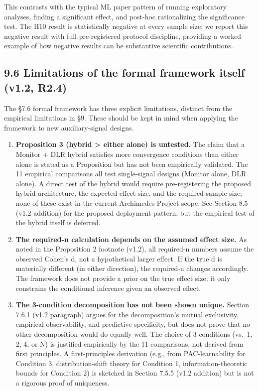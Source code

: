 \documentclass[
]{article}
\newcounter{none} %
\begin{document}
This contrasts with the typical ML paper pattern of running exploratory
analyses, finding a significant effect, and post-hoc rationalizing the
significance test. The H10 result is statistically negative at every
sample size; we report this negative result with full pre-registered
protocol discipline, providing a worked example of how negative results
can be substantive scientific contributions.

\subsection{9.6 Limitations of the formal framework itself (v1.2,
R2.4)}\label{limitations-of-the-formal-framework-itself-v1.2-r2.4}

The §7.6 formal framework has three explicit limitations, distinct from
the empirical limitations in §9. These should be kept in mind when
applying the framework to new auxiliary-signal designs.

\begin{enumerate}
\def\labelenumi{\arabic{enumi}.}
\item
  \textbf{Proposition 3 (hybrid \textgreater{} either alone) is
  untested.} The claim that a Monitor + DLR hybrid satisfies more
  convergence conditions than either alone is stated as a Proposition
  but has not been empirically validated. The 11 empirical comparisons
  all test single-signal designs (Monitor alone, DLR alone). A direct
  test of the hybrid would require pre-registering the proposed hybrid
  architecture, the expected effect size, and the required sample size;
  none of these exist in the current Archimedes Project scope. See
  Section 8.5 (v1.2 addition) for the proposed deployment pattern, but
  the empirical test of the hybrid itself is deferred.
\item
  \textbf{The required-n calculation depends on the assumed effect
  size.} As noted in the Proposition 2 footnote (v1.2), all required-n
  numbers assume the observed Cohen's d, not a hypothetical larger
  effect. If the true d is materially different (in either direction),
  the required-n changes accordingly. The framework does not provide a
  prior on the true effect size; it only constrains the conditional
  inference given an observed effect.
\item
  \textbf{The 3-condition decomposition has not been shown unique.}
  Section 7.6.1 (v1.2 paragraph) argues for the decomposition's mutual
  exclusivity, empirical observability, and predictive specificity, but
  does not prove that no other decomposition would do equally well. The
  choice of 3 conditions (vs.~1, 2, 4, or N) is justified empirically by
  the 11 comparisons, not derived from first principles. A
  first-principles derivation (e.g., from PAC-learnability for Condition
  3, distribution-shift theory for Condition 1, information-theoretic
  bounds for Condition 2) is sketched in Section 7.5.5 (v1.2 addition)
  but is not a rigorous proof of uniqueness.
\end{enumerate}
\end{document}
